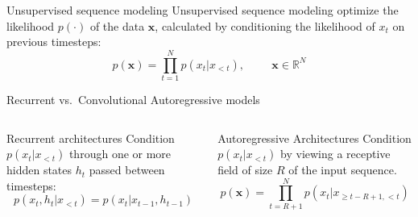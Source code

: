 \documentclass[
  ignorenonframetext,
  aspectratio=169,
]{beamer}
\begin{document}
\begin{frame}{Unsupervised sequence modeling}
\protect\hypertarget{unsupervised-sequence-modeling}{}
Unsupervised sequence modeling optimize the likelihood \(p(\cdot)\) of
the data \(\mathbf{x}\), calculated by conditioning the likelihood of
\(x_t\) on previous timesteps: \[
p(\mathbf{x}) = \prod^N_{t=1}  p(x_t | x_{<t}) , \hspace{1cm}  \mathbf{x}\in \mathbb{R}^N
\]
\end{frame}

\begin{frame}{Recurrent vs.~Convolutional Autoregressive models}
\protect\hypertarget{recurrent-vs.-convolutional-autoregressive-models}{}
\begin{figure}[t]  
\centering 
  \begin{subfigure}[b]{0.45\linewidth}
  \resizebox{\columnwidth}{!}
    {
    }
  \end{subfigure}
  \hfill
  \begin{subfigure}[b]{0.45\linewidth}
  \resizebox{\columnwidth}{!}
    {
    }
  \end{subfigure}
\end{figure}  

\begin{columns}[T]
\begin{column}{0.48\textwidth}
\begin{block}{Recurrent architectures}
\protect\hypertarget{recurrent-architectures}{}
Condition \(p(x_t|x_{<t})\) through one or more hidden states \(h_t\)
passed between timesteps: \[
p(x_t, h_t | x_{<t}) = p(x_t | x_{t-1}, h_{t-1})
\]
\end{block}
\end{column}

\begin{column}{0.48\textwidth}
\begin{block}{Autoregressive Architectures}
\protect\hypertarget{autoregressive-architectures}{}
Condition \(p(x_t|x_{<t})\) by viewing a receptive field of size \(R\)
of the input sequence. \[
p(\mathbf{x}) = \prod^N_{t=R+1} p(x_t | x_{\geq t-R+1, <t})
\]
\end{block}
\end{column}
\end{columns}
\end{frame}
\end{document}

